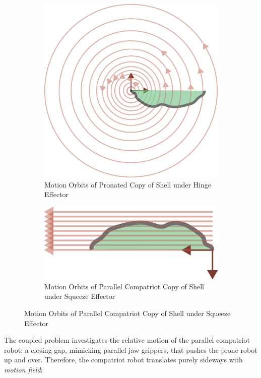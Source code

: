 \documentclass[letterpaper]{report}
\begin{document}
 \begin{figure}[ht]
   \begin{subfigure}[t]{0.5\textwidth}
     \centering
     \includegraphics[width=\linewidth,trim={10cm 5cm 0 5cm},clip]{ShapeForContact_hinge2.eps}
     \caption{\label{fig:rotMot}Motion Orbits of Pronated Copy of Shell under Hinge Effector}
   \end{subfigure}
   \begin{subfigure}[t]{0.5\textwidth}
     \centering
     \includegraphics[width=\linewidth]{ShapeForContact_jaw.eps}
     \caption{\label{fig:transMot}Motion Orbits of Parallel Compatriot Copy of Shell under Squeeze Effector}
   \end{subfigure}
 \end{figure}

The coupled problem investigates the relative motion of the parallel compatriot robot: a closing gap, mimicking parallel jaw grippers, that pushes the prone robot up and over.
Therefore, the compatriot robot translates purely sideways with \textit{motion field}:
\end{document}

